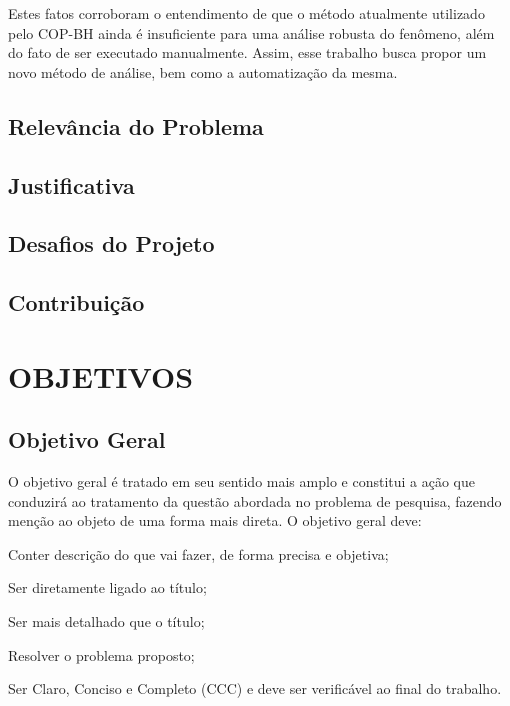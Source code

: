 Estes fatos corroboram o entendimento de que o método atualmente utilizado pelo COP-BH ainda é insuficiente para uma análise robusta do fenômeno, além do fato de ser executado manualmente. Assim, esse trabalho busca propor um novo método de análise, bem como a automatização da mesma.

\subsection{Relevância do Problema}

\subsection{Justificativa}

\subsection{Desafios do Projeto}

\subsection{Contribuição}


\section{OBJETIVOS}
\label{sec:objetivos}

\subsection{Objetivo Geral}
\label{subsec:objgeral}
O objetivo geral é tratado em seu sentido mais amplo e constitui a ação que conduzirá ao tratamento da questão abordada no problema de pesquisa, fazendo menção ao objeto de uma forma mais direta. O objetivo geral deve:

Conter descrição do que vai fazer, de forma precisa e objetiva;

Ser diretamente ligado ao título;

Ser mais detalhado que o título;

Resolver o problema proposto;

Ser Claro, Conciso e Completo (CCC) e deve ser verificável ao final do trabalho.

